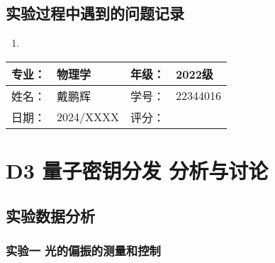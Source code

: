 \documentclass[dvipsnames, svgnames,a4paper,11pt]{article}
\begin{document}









\subsection{实验过程中遇到的问题记录}

\begin{enumerate}
	\item 
	
\end{enumerate}
	

\clearpage
\begin{table}
	\renewcommand\arraystretch{1.7}
	\begin{tabularx}{\textwidth}{|X|X|X|X|}
	\hline
	专业：& 物理学 &年级：& 2022级\\
	\hline
	姓名： & 戴鹏辉 & 学号：& 22344016\\
	\hline
    日期：& 2024/XXXX & 评分： &\\
	\hline
	\end{tabularx}
\end{table}

\section{D3 \quad 量子密钥分发 \quad\heiti 分析与讨论}

\subsection{实验数据分析}


	\subsubsection{实验一 \quad 光的偏振的测量和控制}
\end{document}
